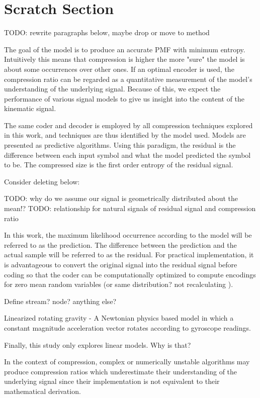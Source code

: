 \documentclass[journal]{IEEEtran}
\begin{document}
\clearpage
\section*{Scratch Section}
TODO: rewrite paragraphs below, maybe drop or move to method

The goal of the model is to produce an accurate PMF with minimum entropy. Intuitively this means that compression is higher the more "sure" the model is about some occurrences over other ones. If an optimal encoder is used, the compression ratio can be regarded as a quantitative measurement of the model's understanding of the underlying signal. Because of this, we expect the performance of various signal models to give us insight into the content of the kinematic signal.

The same coder and decoder is employed by all compression techniques explored in this work, and techniques are thus identified by the model used. Models are presented as predictive algorithms. Using this paradigm, the residual is the difference between each input symbol and what the model predicted the symbol to be. The compressed size is the first order entropy of the residual signal.


Consider deleting below:

TODO: why do we assume our signal is geometrically distributed about the mean!?
TODO: relationship for natural signals of residual signal and compression ratio

In this work, the maximum likelihood occurrence according to the model will be referred to as the prediction. The difference between the prediction and the actual sample will be referred to as the residual. For practical implementation, it is advantageous to convert the original signal into the residual signal before coding so that the coder can be computationally optimized to compute encodings for zero mean random variables (or same distribution? not recalculating ).

Define stream? node? anything else?

Linearized rotating gravity - A Newtonian physics based model in which a constant magnitude acceleration vector rotates according to gyroscope readings.

Finally, this study only explores linear models. Why is that?

 In the context of compression, complex or numerically unstable algorithms may produce compression ratios which underestimate their understanding of the underlying signal since their implementation is not equivalent to their mathematical derivation.
\end{document}
